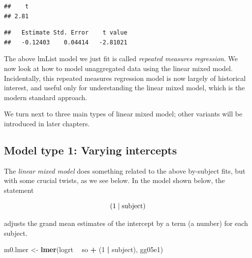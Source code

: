 \documentclass[12pt,]{krantz}
\newenvironment{Shaded}{\begin{snugshade}}{\end{snugshade}}
\newcommand{\CommentTok}[1]{\textcolor[rgb]{0.56,0.35,0.01}{\textit{#1}}}
\newcommand{\DecValTok}[1]{\textcolor[rgb]{0.00,0.00,0.81}{#1}}
\newcommand{\KeywordTok}[1]{\textcolor[rgb]{0.13,0.29,0.53}{\textbf{#1}}}
\newcommand{\NormalTok}[1]{#1}
\newcommand{\OperatorTok}[1]{\textcolor[rgb]{0.81,0.36,0.00}{\textbf{#1}}}
\newcommand{\StringTok}[1]{\textcolor[rgb]{0.31,0.60,0.02}{#1}}
\begin{document}
\begin{verbatim}
##    t 
## 2.81
\end{verbatim}

\begin{Shaded}
\end{Shaded}

\begin{verbatim}
##   Estimate Std. Error    t value 
##   -0.12403    0.04414   -2.81021
\end{verbatim}

The above lmList model we just fit is called \emph{repeated measures regression}. We now look at how to model unaggregated data using the linear mixed model. Incidentally, this repeated measures regression model is now largely of historical interest, and useful only for understanding the linear mixed model, which is the modern standard approach.

We turn next to three main types of linear mixed model; other variants will be introduced in later chapters.

\hypertarget{model-type-1-varying-intercepts}{%
\subsection{Model type 1: Varying intercepts}\label{model-type-1-varying-intercepts}}

The \emph{linear mixed model} does something related to the above by-subject fits, but with some crucial twists, as we see below.
In the model shown below, the statement

\begin{equation}
(1 \mid \hbox{subject}) 
\end{equation}

adjusts the grand mean estimates of the intercept by a term (a number) for each subject.

\begin{Shaded}
\begin{Highlighting}[]
\NormalTok{m0.lmer <-}\StringTok{ }\KeywordTok{lmer}\NormalTok{(logrt }\OperatorTok{~}\StringTok{ }\NormalTok{so }\OperatorTok{+}\StringTok{ }\NormalTok{(}\DecValTok{1} \OperatorTok{|}\StringTok{ }\NormalTok{subject), gg05e1)}
\end{Highlighting}
\end{Shaded}
\end{document}
